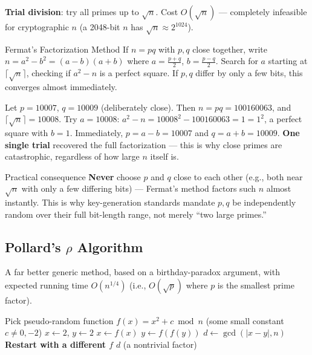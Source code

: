 \textbf{Trial division}: try all primes up to $\sqrt{n}$. Cost $O(\sqrt{n})$ — completely infeasible for cryptographic $n$ (a 2048-bit $n$ has $\sqrt{n} \approx 2^{1024}$).

\begin{keybox}{Fermat's Factorization Method}
If $n = pq$ with $p,q$ close together, write $n = a^2 - b^2 = (a-b)(a+b)$ where $a = \frac{p+q}{2}$, $b = \frac{p-q}{2}$. Search for $a$ starting at $\lceil\sqrt{n}\rceil$, checking if $a^2 - n$ is a perfect square. If $p, q$ differ by only a few bits, this converges almost immediately.
\end{keybox}

\begin{example}
Let $p = 10007$, $q = 10009$ (deliberately close). Then $n = pq = 100160063$, and $\lceil\sqrt{n}\rceil = 10008$. Try $a = 10008$: $a^2 - n = 10008^2 - 100160063 = 1 = 1^2$, a perfect square with $b=1$. Immediately, $p = a - b = 10007$ and $q = a+b = 10009$. \textbf{One single trial} recovered the full factorization — this is why close primes are catastrophic, regardless of how large $n$ itself is.
\end{example}

\begin{warnbox}{Practical consequence}
\textbf{Never} choose $p$ and $q$ close to each other (e.g., both near $\sqrt{n}$ with only a few differing bits) — Fermat's method factors such $n$ almost instantly. This is why key-generation standards mandate $p, q$ be independently random over their full bit-length range, not merely ``two large primes.''
\end{warnbox}

\subsection{Pollard's $\rho$ Algorithm}

A far better generic method, based on a birthday-paradox argument, with expected running time $O(n^{1/4})$ (i.e., $O(\sqrt{p})$ where $p$ is the smallest prime factor).

\begin{algorithm}[h]
\caption{Pollard's $\rho$ (Floyd cycle-detection variant)}
\begin{algorithmic}[1]
\State Pick pseudo-random function $f(x) = x^2 + c \bmod n$ (some small constant $c \ne 0, -2$)
\State $x \gets 2$, $y \gets 2$
\Repeat
    \State $x \gets f(x)$
    \State $y \gets f(f(y))$
    \State $d \gets \gcd(|x - y|, n)$
 \State \textbf{Restart with a different $f$} \Else \State \Return $d$ (a nontrivial factor) \EndIf
\end{algorithmic}
\end{algorithm}

